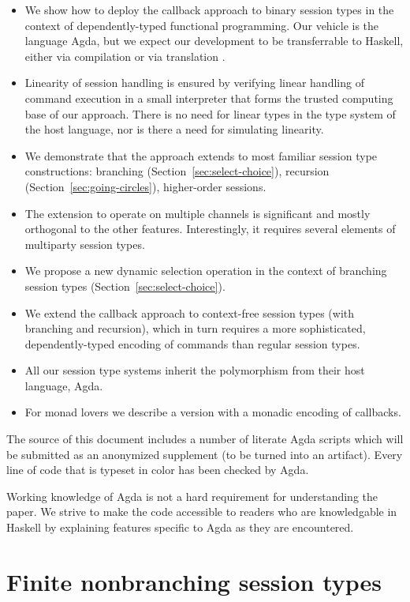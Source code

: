 \documentclass[acmsmall,screen,anonymous,review]{acmart}
\begin{document}
\begin{itemize}
\item We show how to deploy the callback approach to binary session
  types in the context of dependently-typed functional
  programming. Our vehicle is the language Agda, but we expect our
  development to be transferrable to Haskell, either via compilation or via translation
  \cite{DBLP:conf/haskell/CockxME0N22}.
\item Linearity of session handling is ensured by verifying linear
  handling of command execution in a small interpreter that forms the
  trusted computing base of our approach. There is no need for linear
  types in the type system of the host language, nor is there a need
  for simulating linearity.
\item We demonstrate that the approach extends to most familiar
  session type constructions: branching
  (Section~\ref{sec:select-choice}), recursion
  (Section~\ref{sec:going-circles}), higher-order sessions.
\item The extension to operate on multiple channels is significant and
  mostly orthogonal to the other features. Interestingly, it requires
  several elements of multiparty session types.
\item We propose a new dynamic selection operation in the context of
  branching session types (Section~\ref{sec:select-choice}).
\item We extend the callback approach to context-free session types
  (with branching and recursion), which in turn requires a more
  sophisticated, dependently-typed encoding of commands than regular
  session types.
\item All our session type systems inherit the polymorphism from their
  host language, Agda.
\item For monad lovers we describe a version with a monadic encoding of callbacks.
\end{itemize}

The source of this document includes a number of literate Agda
scripts which will be submitted as an anonymized supplement (to be
turned into an artifact). Every line of code that is typeset in color
has been checked by Agda.


Working knowledge of Agda is not a hard requirement for understanding the
paper. We strive to make the code accessible to readers who are
knowledgable in Haskell by explaining features specific
to Agda as they are encountered.

\section{Finite nonbranching session types}
\label{sec:finite-nonbr-simple}
\end{document}
